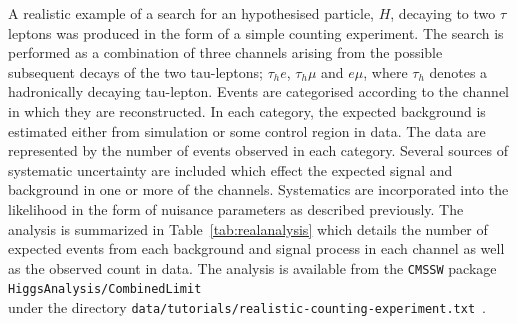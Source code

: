 A realistic example of a search for an hypothesised particle, $H$, 
decaying to two $\tau$ leptons was produced in the form 
of a simple counting experiment. The search is performed as a combination of 
three channels arising from the possible subsequent 
decays of the two tau-leptons; $\tau_{h}e$, $\tau_{h}\mu$ and $e\mu$, where $\tau_{h}$
denotes a hadronically decaying tau-lepton. 
Events are categorised according to the channel in which they are reconstructed.
In each category, the expected background is estimated
either from simulation or some control region in data. 
The data are represented by the number of events observed in each category.
Several sources of systematic uncertainty are included which effect the
expected signal and background in one or more of the channels. 
Systematics are incorporated into the likelihood in the form of nuisance 
parameters as described previously. The analysis is summarized in 
Table~\ref{tab:realanalysis} which details the number of expected events 
from each background and signal process in each channel as well as the 
observed count in data. 
The analysis is available from the \texttt{CMSSW} package \texttt{HiggsAnalysis/CombinedLimit}\\
under the directory \texttt{data/tutorials/realistic-counting-experiment.txt}~\citep{null}.

